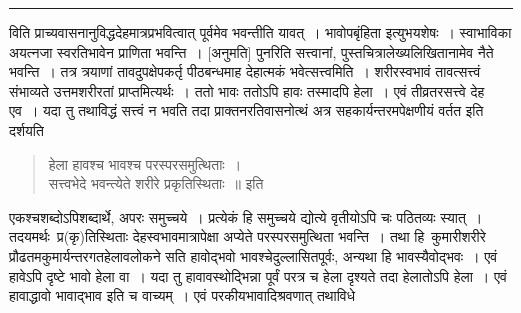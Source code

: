 \documentclass[11pt, openany]{book}
\begin{document}
\newpage

\begin{quote}
 {}
\end{quote}

\hrule

\vspace{2mm}

\noindent
विति प्राच्यवासनानुविद्धदेहमात्रप्रभवित्वात् पूर्वमेव भवन्तीति यावत्~। भावोपबृंहिता इत्युभयशेषः~। स्वाभाविका अयत्नजा स्वरतिभावेन प्राणिता भवन्ति~। [अनुमति] पुनरिति सत्त्वानां, पुस्तचित्रालेख्यलिखितानामेव नैते भवन्ति~। तत्र त्रयाणां तावदुपक्षेपकर्तृ पीठबन्धमाह देहात्मकं भवेत्सत्त्वमिति~। शरीरस्वभावं तावत्सत्त्वं संभाव्यते उत्तमशरीरतां प्राप्तमित्यर्थः~। ततो भावः ततोऽपि हावः तस्मादपि हेला~। एवं तीव्रतरसत्त्वे देह एव~। यदा तु तथाविद्धं सत्त्वं न भवति तदा प्राक्तनरतिवासनोत्थं अत्र सहकार्यन्तरमपेक्षणीयं वर्तत इति दर्शयति\textendash\ 

\begin{quote}
 {\qt हेला हावश्च भावश्च परस्परसमुत्थिताः~। \\
सत्त्वभेदे भवन्त्येते शरीरे प्रकृतिस्थिताः~॥ इति }
\end{quote}

एकश्चशब्दोऽपिशब्दार्थे, अपरः समुच्चये~। प्रत्येकं हि समुच्चये द्योत्ये वृतीयोऽपि चः पठितव्यः स्यात्~। तदयमर्थः\textendash\ प्र(कृ)तिस्थिताः देहस्वभावमात्रापेक्षा अप्येते परस्परसमुत्थिता भवन्ति~। तथा हि\textendash\ कुमारीशरीरे प्रौढतमकुमार्यन्तरगतहेलावलोकने सति हावोद्भवो भावश्चेदुल्लासितपूर्वः, अन्यथा हि भावस्यैवोद्भवः~। एवं हावेऽपि दृष्टे भावो हेला वा~। यदा तु हावावस्थोद्भिन्ना पूर्वं परत्र च हेला दृश्यते तदा हेलातोऽपि हेला~। एवं हावाद्धावो भावाद्भाव इति च वाच्यम्~। एवं परकीयभावादिश्रवणात् तथाविधे\textendash\ 
\end{document}
